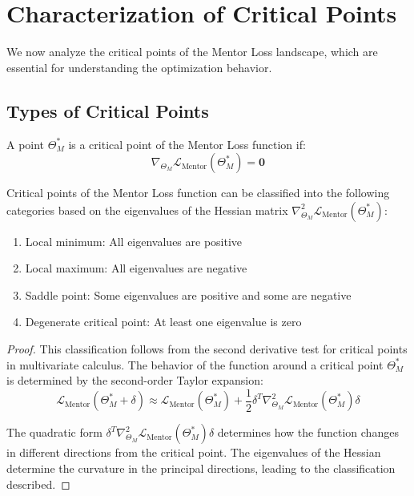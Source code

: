 \section{Characterization of Critical Points}

We now analyze the critical points of the Mentor Loss landscape, which are essential for understanding the optimization behavior.

\subsection{Types of Critical Points}

\begin{definition}
A point $\Theta_M^*$ is a critical point of the Mentor Loss function if:
\begin{equation}
\nabla_{\Theta_M} \mathcal{L}_{\text{Mentor}}(\Theta_M^*) = \mathbf{0}
\end{equation}
\end{definition}

\begin{theorem}
Critical points of the Mentor Loss function can be classified into the following categories based on the eigenvalues of the Hessian matrix $\nabla^2_{\Theta_M} \mathcal{L}_{\text{Mentor}}(\Theta_M^*)$:
\begin{enumerate}
    \item Local minimum: All eigenvalues are positive
    \item Local maximum: All eigenvalues are negative
    \item Saddle point: Some eigenvalues are positive and some are negative
    \item Degenerate critical point: At least one eigenvalue is zero
\end{enumerate}
\end{theorem}

\begin{proof}
This classification follows from the second derivative test for critical points in multivariate calculus. The behavior of the function around a critical point $\Theta_M^*$ is determined by the second-order Taylor expansion:
\begin{equation}
\mathcal{L}_{\text{Mentor}}(\Theta_M^* + \delta) \approx \mathcal{L}_{\text{Mentor}}(\Theta_M^*) + \frac{1}{2}\delta^T \nabla^2_{\Theta_M} \mathcal{L}_{\text{Mentor}}(\Theta_M^*) \delta
\end{equation}

The quadratic form $\delta^T \nabla^2_{\Theta_M} \mathcal{L}_{\text{Mentor}}(\Theta_M^*) \delta$ determines how the function changes in different directions from the critical point. The eigenvalues of the Hessian determine the curvature in the principal directions, leading to the classification described.
\end{proof}

